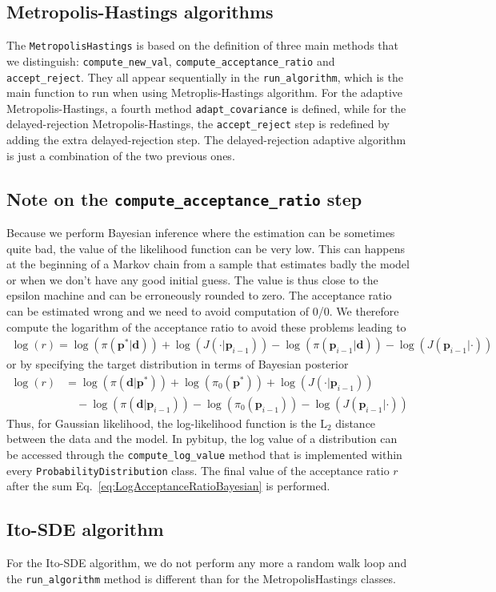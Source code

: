 \documentclass[a4paper,11pt]{article}
\begin{document}
\subsection{Metropolis-Hastings algorithms}

The \texttt{MetropolisHastings} is based on the definition of three main methods that we distinguish: \texttt{compute\_new\_val},  \texttt{compute\_acceptance\_ratio} and \texttt{accept\_reject}. They all appear sequentially in the \texttt{run\_algorithm}, which is the main function to run when using Metroplis-Hastings algorithm. For the adaptive Metropolis-Hastings, a fourth method \texttt{adapt\_covariance} is defined, while for the delayed-rejection Metropolis-Hastings, the \texttt{accept\_reject} step is redefined by adding the extra delayed-rejection step. The delayed-rejection adaptive algorithm is just a combination of the two previous ones. 

\subsection{Note on the \texttt{compute\_acceptance\_ratio} step}

Because we perform Bayesian inference where the estimation can be sometimes quite bad, the value of the likelihood function can be very low. This can happens at the beginning of a Markov chain from a sample that estimates badly the model or when we don't have any good initial guess. The value is thus close to the epsilon machine and can be erroneously rounded to zero. The acceptance ratio can be estimated wrong and we need to avoid computation of 0/0. We therefore compute the logarithm of the acceptance ratio to avoid these problems leading to 
\begin{align}
\log(r) = \log(\pi(\mathbf{p}^* | \mathbf{d})) + \log(J(\cdot | \mathbf{p}_{i-1})) - \log(\pi(\mathbf{p}_{i-1} | \mathbf{d}) ) - \log(J(\mathbf{p}_{i-1} | \cdot) ) 
\label{eq:LogAcceptanceRatio}
\end{align}
or by specifying the target distribution in terms of Bayesian posterior 
\begin{align}
\log(r) &= \log(\pi (\mathbf{d} | \mathbf{p}^*)) + \log (\pi_0(\mathbf{p}^*)) + \log(J(\cdot | \mathbf{p}_{i-1})) \nonumber \\ 
& \quad - \log(\pi(\mathbf{d} | \mathbf{p}_{i-1}))  - \log(\pi_0(\mathbf{p}_{i-1})) - \log(J(\mathbf{p}_{i-1} | \cdot) ) 
\label{eq:LogAcceptanceRatioBayesian}
\end{align}
Thus, for Gaussian likelihood, the log-likelihood function is the $\text{L}_2$ distance between the data and the model. In pybitup, the log value of a distribution can be accessed through the \texttt{compute\_log\_value} method that is implemented within every \texttt{ProbabilityDistribution} class. The final value of the acceptance ratio $r$ after the sum Eq.~\ref{eq:LogAcceptanceRatioBayesian} is performed.

\subsection{Ito-SDE algorithm}

For the Ito-SDE algorithm, we do not perform any more a random walk loop and the \texttt{run\_algorithm} method is different than for the MetropolisHastings classes. 
\end{document}
